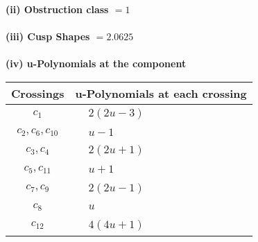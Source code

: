 \documentclass[1p]{elsarticle_modified}
\theoremstyle{definition}
\begin{document}
\flushleft \textbf{(ii) Obstruction class $= 1$}\\~\\
\flushleft \textbf{(iii) Cusp Shapes $= 2.0625$}\\~\\
\newpage\renewcommand{\arraystretch}{1}
\flushleft \textbf{(iv) u-Polynomials at the component}\newline \\
\begin{tabular}{m{50pt}|m{274pt}}
Crossings & \hspace{64pt}u-Polynomials at each crossing \\
\hline $$\begin{aligned}c_{1}\end{aligned}$$&$\begin{aligned}
&2(2 u-3)
\end{aligned}$\\
\hline $$\begin{aligned}c_{2},c_{6},c_{10}\end{aligned}$$&$\begin{aligned}
&u-1
\end{aligned}$\\
\hline $$\begin{aligned}c_{3},c_{4}\end{aligned}$$&$\begin{aligned}
&2(2 u+1)
\end{aligned}$\\
\hline $$\begin{aligned}c_{5},c_{11}\end{aligned}$$&$\begin{aligned}
&u+1
\end{aligned}$\\
\hline $$\begin{aligned}c_{7},c_{9}\end{aligned}$$&$\begin{aligned}
&2(2 u-1)
\end{aligned}$\\
\hline $$\begin{aligned}c_{8}\end{aligned}$$&$\begin{aligned}
&u
\end{aligned}$\\
\hline $$\begin{aligned}c_{12}\end{aligned}$$&$\begin{aligned}
&4(4 u+1)
\end{aligned}$\\
\hline
\end{tabular}\\~\\
\end{document}

